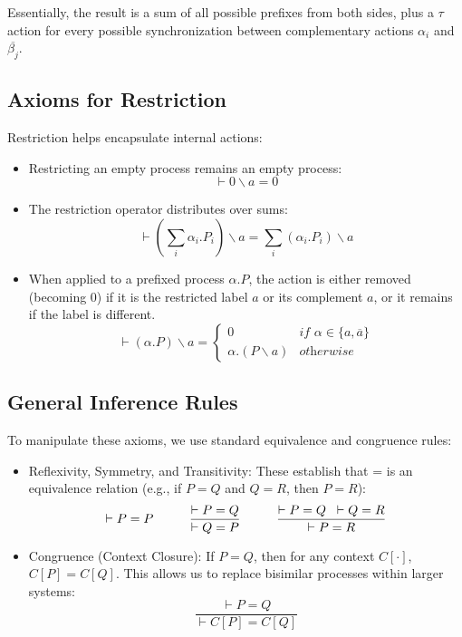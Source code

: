 Essentially, the result is a sum of all possible prefixes from both sides, plus a $\tau$ action for every possible synchronization between complementary actions $\alpha_i$ and $\overline{\beta_j}$.

\subsection{Axioms for Restriction}
Restriction helps encapsulate internal actions:
\begin{itemize}
    \item Restricting an empty process remains an empty process: 
    \begin{equation*}
        \vdash 0\backslash a=0
    \end{equation*}
    \item The restriction operator distributes over sums: 
    \begin{equation*}
        \vdash(\sum_i\alpha_i.P_i)\backslash a=\sum_i(\alpha_i.P_i)\backslash a
    \end{equation*}
    \item When applied to a prefixed process $\alpha.P$, the action is either removed (becoming 0) if it is the restricted label $a$ or its complement $a$, or it remains if the label is different.
    \begin{equation*}
        \vdash (\alpha.P)\backslash a = \begin{cases}
            0 & \textit{if }\alpha\in\{a, \overline{a}\}\\
            \alpha.(P\backslash a) &\textit{otherwise}
        \end{cases}
    \end{equation*}
\end{itemize}

\subsection{General Inference Rules}
To manipulate these axioms, we use standard equivalence and congruence rules:
\begin{itemize}
    \item Reflexivity, Symmetry, and Transitivity: These establish that = is an equivalence relation (e.g., if $P=Q$ and $Q=R$, then $P=R$):
    \begin{equation*}
        \vdash P = P\hspace{1cm}
        \frac{\vdash P = Q}{\vdash Q = P}\hspace{1cm}
        \frac{\vdash P = Q\hspace{.2cm}\vdash Q = R}{\vdash P = R}
    \end{equation*}
    \item Congruence (Context Closure): If $P=Q$, then for any context $C[\cdot]$, $C[P]=C[Q]$. This allows us to replace bisimilar processes within larger systems:
    \begin{equation*}
        \frac{\vdash P = Q}{\vdash C[P] = C[Q]}
    \end{equation*}
\end{itemize}

